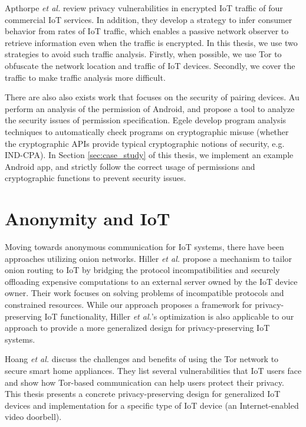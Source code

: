 Apthorpe \textit{et al.} \cite{apthorpe2017smart} review privacy vulnerabilities in encrypted IoT traffic of four commercial IoT services. In addition, they develop a strategy to infer consumer behavior from rates of IoT traffic, which enables a passive network observer to retrieve information even when the traffic is encrypted. In this thesis, we use two strategies to avoid such traffic analysis. Firstly, when possible, we use Tor to obfuscate the network location and traffic of IoT devices. Secondly, we cover the traffic to make traffic analysis more difficult.

There are also also exists work that focuses on the security of pairing devices. Au \cite{au2012pscout} perform an analysis of the permission of Android, and propose a tool to analyze the security issues of permission specification. Egele \cite{egele2013empirical} develop program analysis techniques to automatically check programs on cryptographic misuse (whether the cryptographic APIs provide typical cryptographic notions of security, e.g. IND-CPA). In Section \ref{sec:case_study} of this thesis, we implement an example Android app, and strictly follow the correct usage of permissions and cryptographic functions to prevent security issues.



\section{Anonymity and IoT}

Moving towards anonymous communication for IoT systems, there have been approaches utilizing onion networks. Hiller \textit{et al.} \cite{hiller2019tailoring} propose a mechanism to tailor onion routing to IoT by bridging the protocol incompatibilities and securely offloading expensive computations to an external server owned by the IoT device owner. Their work focuses on solving problems of incompatible protocols and constrained resources. While our approach proposes a framework for privacy-preserving IoT functionality, Hiller \textit{et al.}'s optimization is also applicable to our approach to provide a more generalized design for privacy-preserving IoT systems.

Hoang \textit{et al.} \cite{hoang2015tor} discuss the challenges and benefits of using the Tor network to secure smart home appliances. They list several  vulnerabilities that IoT users face and show how Tor-based communication can help users protect their privacy. This thesis presents a concrete privacy-preserving design for generalized IoT devices and implementation for a specific type of IoT device (an Internet-enabled video doorbell).

